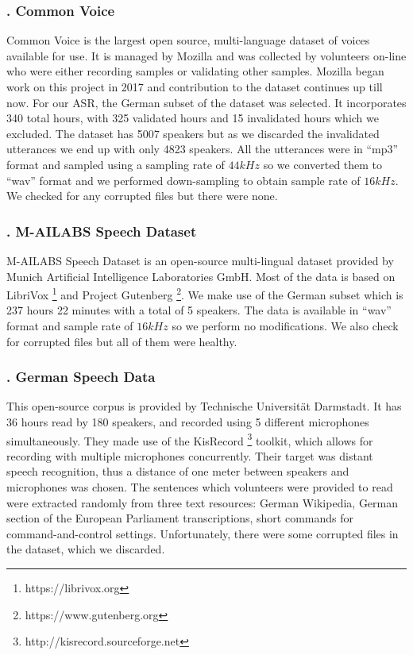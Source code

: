 \subsubsection{. Common Voice}
\label{meth:subsubsub1}

Common Voice is the largest open source, multi-language dataset of voices available for use. It is managed by Mozilla and was collected by volunteers on-line who were either recording samples or validating other samples. Mozilla began work on this project in 2017 and contribution to the dataset continues up till now. 
For our \ac{ASR}, the German subset of the dataset was selected. It incorporates 340 total hours, with 325 validated hours and 15 invalidated hours which we excluded. The dataset has 5007 speakers but as we discarded the invalidated utterances we end up with only 4823 speakers. 
All the utterances were in \enquote{mp3} format and sampled using a sampling rate of $44 kHz$ so we converted them to \enquote{wav} format and we performed down-sampling to obtain sample rate of $16 kHz$. We checked for any corrupted files but there were none.


\subsubsection{. M-AILABS Speech Dataset}
\label{meth:subsub2}
M-AILABS Speech Dataset is an open-source multi-lingual dataset provided by Munich Artificial Intelligence Laboratories GmbH. Most of the data is based on LibriVox \footnote{https://librivox.org} and Project Gutenberg \footnote{https://www.gutenberg.org}. We make use of the German subset which is 237 hours 22 minutes with a total of 5 speakers. The data is available in \enquote{wav} format and sample rate of $16 kHz$ so we perform no modifications. We also check for corrupted files but all of them were healthy.

\subsubsection{. German Speech Data \cite{radeck2015open}}
\label{meth:subsub3}

This open-source corpus is provided by Technische Universit{\"a}t Darmstadt. It has 36 hours read by 180 speakers, and recorded using 5 different microphones simultaneously. They made use of the KisRecord \footnote{http://kisrecord.sourceforge.net} toolkit, which allows for recording with multiple microphones concurrently. Their target was distant speech recognition, thus a distance of one meter between speakers and microphones was chosen. The sentences which volunteers were provided to read were extracted randomly from three text resources: German Wikipedia, German section of the European Parliament transcriptions, short commands for command-and-control settings. Unfortunately, there were some corrupted files in the dataset, which we discarded.



